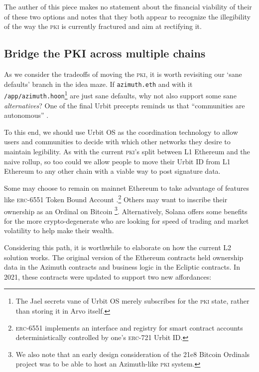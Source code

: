 \documentclass[twoside]{article}
\begin{document}
The auther of this piece makes no statement about the financial viability of their of these two options and notes that they both appear to recognize the illegibility of the way the \textsc{pki} is currently fractured and aim at rectifying it.

\subsection[Bridge the \textsc{pki} across multiple chains]{Bridge the PKI across multiple chains}

\sloppy
As we consider the tradeoffs of moving the \textsc{pki}, it is worth revisiting our `sane defaults' branch in the idea maze. If \lstinline[style=inlinecode]{azimuth.eth} and with it \lstinline[style=inlinecode]{/app/azimuth.hoon}\footnote{The Jael secrets vane of Urbit OS merely subscribes for the \textsc{pki} state, rather than storing it in Arvo itself.} are just sane defaults, why not also support some sane \emph{alternatives}? One of the final Urbit precepts reminds us that ``communities are autonomous'' \citep{UrbitPrecepts}.

To this end, we should use Urbit OS as the coordination technology to allow users and communities to decide with which other networks they desire to maintain legibility. As with the current \textsc{pki}'s split between L1 Ethereum and the naive rollup, so too could we allow people to move their Urbit ID from L1 Ethereum to any other chain with a viable way to post signature data.

Some may choose to remain on mainnet Ethereum to take advantage of features like \textsc{erc}-6551 Token Bound Account \citep{EIP6551}.\footnote{\textsc{erc}-6551 implements an interface and registry for smart contract accounts deterministically controlled by one's \textsc{erc}-721 Urbit ID.} Others may want to inscribe their ownership as an Ordinal on Bitcoin \footnote{We also note that an early design consideration of the 21e8 Bitcoin Ordinals project was to be able to host an Azimuth-like \textsc{pki} system.}. Alternatively, Solana offers some benefits for the more crypto-degenerate who are looking for speed of trading and market volatility to help make their wealth.

Considering this path, it is worthwhile to elaborate on how the current L2 solution works. The original version of the Ethereum contracts held ownership data in the Azimuth contracts and business logic in the Ecliptic contracts. In 2021, these contracts were updated to support two new affordances:
\end{document}
